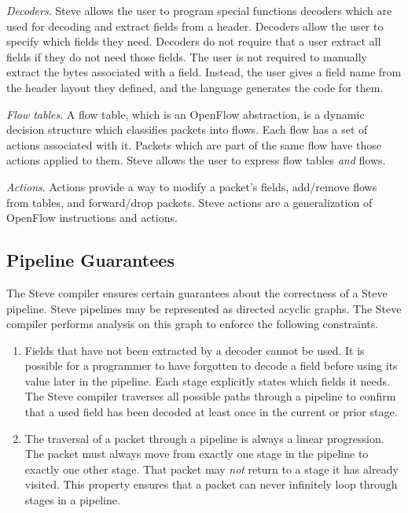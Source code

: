 \emph{Decoders}. Steve allows the user to program special functions decoders
which are used for decoding and extract fields from a header. Decoders allow the
user to specify which fields they need. Decoders do not require that a user
extract all fields if they do not need those fields. The user is not required to
manually extract the bytes associated with a field. Instead, the user gives a
field name from the header layout they defined, and the language generates the
code for them.

\emph{Flow tables}. A flow table, which is an OpenFlow abstraction, is a dynamic
decision structure which classifies packets into flows. Each flow has a set of
actions associated with it. Packets which are part of the same flow have those
actions applied to them. Steve allows the user to express flow tables
\textit{and} flows.

\emph{Actions}. Actions provide a way to modify a packet's fields, add/remove
flows from tables, and forward/drop packets. Steve actions are a generalization
of OpenFlow instructions and actions.


\subsection{Pipeline Guarantees}

The Steve compiler ensures certain guarantees about the correctness of a Steve
pipeline. Steve pipelines may be represented as directed acyclic graphs. The
Steve compiler performs analysis on this graph to enforce the following
constraints.

\begin{enumerate}
\item Fields that have not been extracted by a decoder cannot be used. It is
possible for a programmer to have forgotten to decode a field before using its
value later in the pipeline. Each stage explicitly states which fields it needs.
The Steve compiler traverses all possible paths through a pipeline to confirm
that a used field has been decoded at least once in the current or prior stage.

\item The traversal of a packet through a pipeline is always a linear
progression. The packet must always move from exactly one stage in the pipeline
to exactly one other stage. That packet may \textit{not} return to a stage it
has already visited. This property ensures that a packet can never infinitely
loop through stages in a pipeline.
\end{enumerate}


